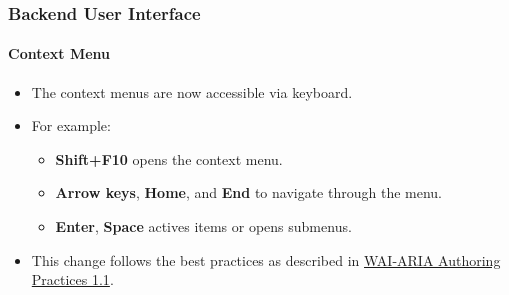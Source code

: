 %

\begin{frame}[fragile]
	\frametitle{Backend User Interface}
	\framesubtitle{Context Menu}

	\begin{itemize}
		\item The context menus are now accessible via keyboard.
		\item For example:

			\begin{itemize}\small
				\item \textbf{Shift+F10} opens the context menu.
				\item \textbf{Arrow keys}, \textbf{Home}, and \textbf{End} to navigate through the menu.
				\item \textbf{Enter}, \textbf{Space} actives items or opens submenus.
			\end{itemize}

		\item This change follows the best practices as described in
			\href{https://www.w3.org/TR/wai-aria-practices-1.1/#keyboard-interaction-12}{WAI-ARIA Authoring Practices 1.1}.

	\end{itemize}

\end{frame}

